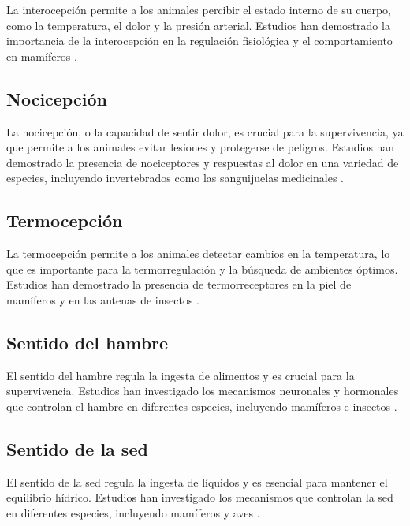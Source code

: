 \documentclass[conference]{IEEEtran}
\begin{document}
La interocepción permite a los animales percibir el estado interno de su cuerpo, como la temperatura, el dolor y la presión arterial.  Estudios han demostrado la importancia de la interocepción en la regulación fisiológica y el comportamiento en mamíferos \cite{craig2002}.

\subsection{Nocicepción}

La nocicepción, o la capacidad de sentir dolor, es crucial para la supervivencia, ya que permite a los animales evitar lesiones y protegerse de peligros. Estudios han demostrado la presencia de nociceptores y respuestas al dolor en una variedad de especies, incluyendo invertebrados como las sanguijuelas medicinales \cite{smith2009invertebrate}.

\subsection{Termocepción}

La termocepción permite a los animales detectar cambios en la temperatura, lo que es importante para la termorregulación y la búsqueda de ambientes óptimos. Estudios han demostrado la presencia de termorreceptores en la piel de mamíferos \cite{hensel1973} y en las antenas de insectos \cite{loftus1968response}.

\subsection{Sentido del hambre}

El sentido del hambre regula la ingesta de alimentos y es crucial para la supervivencia.  Estudios han investigado los mecanismos neuronales y hormonales que controlan el hambre en diferentes especies, incluyendo mamíferos \cite{schwartz2000central} e insectos \cite{simpson2000}.

\subsection{Sentido de la sed}

El sentido de la sed regula la ingesta de líquidos y es esencial para mantener el equilibrio hídrico. Estudios han investigado los mecanismos que controlan la sed en diferentes especies, incluyendo mamíferos \cite{todini2023neuroendocrine} y aves \cite{Fitzsimons1976}.
\end{document}
